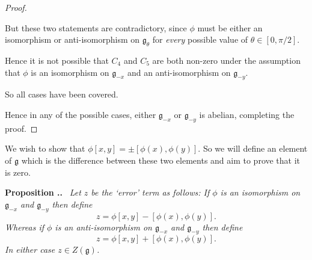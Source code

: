 \documentclass[honours]{UNSWthesis}
\newcommand{\g}{\mathfrak{g}}
\newcommand{\1}{\mathbf{e}_{1}}
\newcommand{\2}{\mathbf{e}_{3}}
\newcommand{\3}{\mathbf{e}_{3}}
\newcounter{Item}[section]
\newenvironment{Proposition}{\medskip
                            \refstepcounter{Item}
                            \noindent
                           {\bf Proposition \thesection.\theItem.}\ %
                            \begingroup \sl}
                           {\endgroup\medskip}
\begin{document}
\begin{proof}
\begin{enumerate}
But these two statements are contradictory, since $\phi$ must be either an isomorphism or anti-isomorphism on $\g_{\theta}$ for \emph{every} possible value of $\theta \in [0, \pi/2]$.

Hence it is not possible that $C_4$ and $C_5$ are both non-zero under the assumption that $\phi$ is an isomorphism on $\g_{-x}$ and an anti-isomorphism on $\g_{-y}$. 

So all cases have been covered.

\end{enumerate}
Hence in any of the possible cases, either $\g_{-x}$ or $\g_{-y}$ is abelian, completing the proof. 

\end{proof}


We wish to show that $\phi[x,y]= \pm[\phi(x),\phi(y)]$. So we will define an element of $\g$ which is the difference between these two elements and aim to prove that it is zero.

\begin{Proposition}
 Let $z$ be the `error' term as follows: If $\phi$ is an isomorphism on $\g_{-x}$ and $\g_{-y}$ then define
\[
z = \phi [x,y] -[\phi(x),\phi(y)].
\]
Whereas if $\phi$ is an anti-isomorphism on $\g_{-x}$ and $\g_{-y}$ then define
\[
z = \phi [x,y] +[\phi(x),\phi(y)].
\]
In either case $z \in Z(\g)$.
\end{Proposition}
\end{document}
